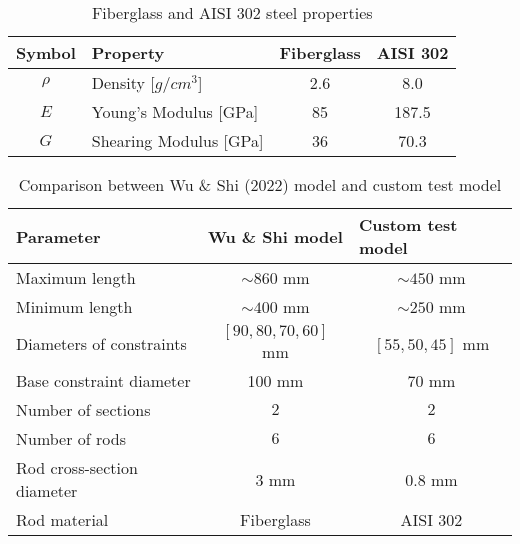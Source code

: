 \begin{table}[]
    \centering
    \caption{Fiberglass and AISI 302 steel properties}
    \label{tab:material-properties}
    \begin{tabular}{@{}clcc@{}}
    \toprule
    Symbol & Property                   & Fiberglass & AISI 302 \\ \midrule
    $\rho$ & Density {[}$g/cm^3${]}        & 2.6        & 8.0      \\
    $E$    & Young's Modulus {[}GPa{]}  & 85         & 187.5    \\
    $G$    & Shearing Modulus {[}GPa{]} & 36         & 70.3     \\ \bottomrule
    \end{tabular}
\end{table}


\begin{table}[]
    \centering
    \caption{Comparison between Wu \& Shi (2022) model and custom test model}
    \label{tab:comparison}
    \begin{tabular}{@{}lcc@{}}
    \toprule
    Parameter                  & \multicolumn{1}{l}{Wu \& Shi model \cite{wu2022}} & \multicolumn{1}{l}{Custom test model} \\ \midrule
    Maximum length             & $\sim860$ mm                     & $\sim450$ mm                       \\
    Minimum length             & $\sim400$ mm                     & $\sim250$ mm                        \\
    Diameters of constraints   & $[90, 80, 70, 60]$ mm               & $[55, 50, 45]$ mm                     \\
    Base constraint diameter   & 100 mm                              & 70 mm                                 \\
    Number of sections         & $2$                                 & $2$                                   \\
    Number of rods             & $6$                                 & $6$                                   \\
    Rod cross-section diameter & $3$ mm                              & $0.8$ mm                              \\
    Rod material               & Fiberglass                          & AISI 302                              \\ \bottomrule
    \end{tabular}
\end{table}


